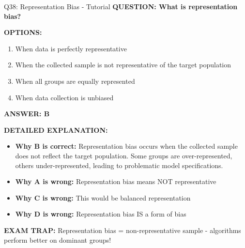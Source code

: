 \documentclass[8pt]{beamer}
\begin{document}
	\begin{frame}{Q38: Representation Bias - Tutorial}
		\fontsize{6.5}{7.5}\selectfont
		\textbf{QUESTION: What is representation bias?}
		
		\vspace{0.1cm}
		\textbf{OPTIONS:}
		\begin{enumerate}
			\item When data is perfectly representative
			\item When the collected sample is not representative of the target population
			\item When all groups are equally represented
			\item When data collection is unbiased
		\end{enumerate}
		
		\vspace{0.1cm}
		\textcolor{myblue}{\textbf{ANSWER: B}}
		
		\vspace{0.1cm}
		\textbf{DETAILED EXPLANATION:}
		\begin{itemize}
			\item \textbf{Why B is correct:} Representation bias occurs when the collected sample does not reflect the target population. Some groups are over-represented, others under-represented, leading to problematic model specifications.
			\item \textbf{Why A is wrong:} Representation bias means NOT representative
			\item \textbf{Why C is wrong:} This would be balanced representation
			\item \textbf{Why D is wrong:} Representation bias IS a form of bias
		\end{itemize}
		
		\textcolor{myred}{\textbf{EXAM TRAP:}} Representation bias = \textcolor{myblue}{non-representative sample} - algorithms perform better on dominant groups!
	\end{frame}
	
\end{document}

